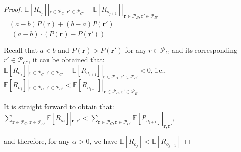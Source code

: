 \documentclass[11pt, oneside]{article}   	%
\begin{document}
\begin{proof}
$\mathbb{E}[R_{o_j}]|_{\bm{r}\in \mathcal{P}_C,\bm{r'}\in \mathcal{P}_{C'}} - \mathbb{E}[R_{o_{j+1}}]|_{\bm{r}\in \mathcal{P}_B,\bm{r'}\in \mathcal{P}_{B'}}$ \\ =$(a-b)P(\bm{r}) + (b-a)P(\bm{r'})$ \\
= $(a-b)\cdot (P(\bm{r}) - P(\bm{r'}))$

Recall that $a<b$ and $P(\bm{r}) > P(\bm{r'})$ for any $r \in \mathcal{P}_C$ and its corresponding $r' \in \mathcal{P}_{C'}$, it can be obtained that: \\
$\mathbb{E}[R_{o_j}]|_{\bm{r}\in \mathcal{P}_C,\bm{r'}\in \mathcal{P}_{C'}} - \mathbb{E}[R_{o_{j+1}}]|_{\bm{r}\in \mathcal{P}_B,\bm{r'}\in \mathcal{P}_{B'}} < 0$, i.e., $\mathbb{E}[R_{o_j}]|_{\bm{r}\in \mathcal{P}_C,\bm{r'}\in \mathcal{P}_{C'}} < \mathbb{E}[R_{o_{j+1}}]|_{\bm{r}\in \mathcal{P}_B,\bm{r'}\in \mathcal{P}_{B'}}$

It is straight forward to obtain that:\\
 $\sum\limits_{\bm{r}\in \mathcal{P}_C, \bm{r}\in \mathcal{P}_{C'}}\mathbb{E}[R_{o_j}] |_{\bm{r}, \bm{r'}} < \sum\limits_{\bm{r}\in \mathcal{P}_C, \bm{r}\in \mathcal{P}_{C'}}\mathbb{E}[R_{o_{j+1}}] |_{\bm{r}, \bm{r'}}$,
 
and therefore, 
for any $\alpha > 0$, we have $\mathbb{E}[R_{o_j}] < \mathbb{E}[R_{o_{j+1}}]$

\end{proof}
\end{document}

